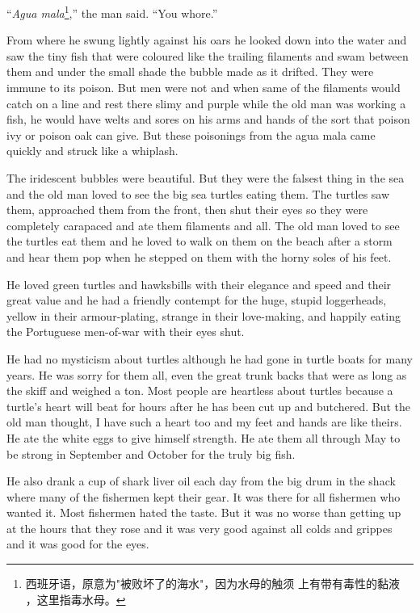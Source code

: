 \documentclass[fontset=ubuntu]{ctexrep}
\begin{document}
``\emph{Agua mala}\footnote{西班牙语，原意为"被败坏了的海水"，因为水母的触须
  上有带有毒性的黏液 ，这里指毒水母。},'' the man said. ``You \gls{whore}.''

From where he \gls{swung} lightly against his oars he looked down into the
water and saw the tiny fish that were coloured like the trailing filaments
and swam between them and under the small shade the bubble made as it
drifted. They were \gls{immune} to its \gls{poison}. But men were not and
when same of the filaments would catch on a line and rest there \gls{slimy}
and purple while the old man was working a fish, he would have \glspl{welt}
and \glspl{sore} on his arms and hands of the sort that poison ivy or poison
oak can give. But these \glspl{poisoning} from the agua mala came quickly and
\gls{struck} like a \gls{whiplash}.

The iridescent bubbles were beautiful. But they were the \gls{falsest} thing
in the sea and the old man loved to see the big sea turtles eating
them. The turtles saw them, \gls{approached} them from the front, then shut
their eyes so they were completely \gls{carapaced} and ate them filaments
and all. The old man loved to see the turtles eat them and he loved to walk
on them on the beach after a storm and hear them pop when he stepped on them
with the \gls{horny} \glspl{sole} of his feet.

He loved green turtles and \glspl{hawksbill} with their \gls{elegance} and
speed and their great value and he had a friendly \gls{contempt} for the
huge, stupid \glspl{loggerhead}, yellow in their armour-plating, strange in their
love-making, and happily eating the Portuguese men-of-war with their eyes
shut.

He had no \gls{mysticism} about turtles although he had gone in turtle boats
for many years. He was sorry for them all, even the great trunk \gls{backs}
that were as long as the skiff and \gls{weighed} a ton. Most people are
\gls{heartless} about turtles because a turtle's heart will beat for hours
after he has been cut up and butchered. But the old man thought, I have such
a heart too and my feet and hands are like theirs. He ate the white eggs to
give himself strength. He ate them all through May to be strong in September
and October for the truly big fish.

He also drank a cup of shark liver oil each day from the big \gls{drum} in the
shack where many of the fishermen kept their gear. It was there for all
fishermen who wanted it. Most fishermen hated the taste. But it was no worse
than getting up at the hours that they rose and it was very good against all
colds and \gls{grippes} and it was good for the eyes.
\end{document}
